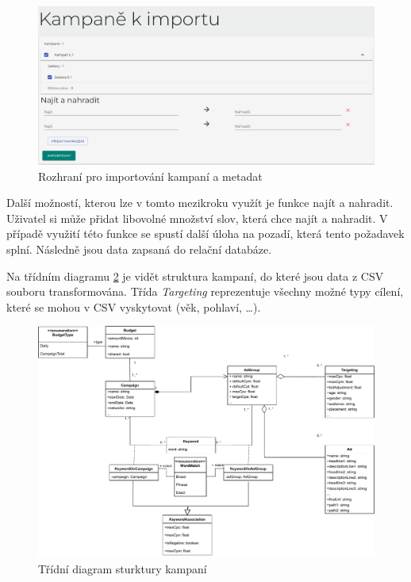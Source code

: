 \begin{figure}[h]
    \centering
    \includegraphics[width=1\textwidth]{Figures/ui/import-sar.png}
    \caption{Rozhraní pro importování kampaní a metadat}
    \label{fig:import-sar}
\end{figure}

Další možností, kterou lze v tomto mezikroku využít je funkce najít a nahradit. Uživatel si může přidat libovolné množství
slov, která chce najít a nahradit. V případě využití této funkce se spustí další úloha na pozadí, která tento požadavek splní.
Následně jsou data zapsaná do relační databáze.

Na třídním diagramu \ref{fig:campaigns-class-diagram} je vidět struktura kampaní, do které jsou data z CSV souboru transformována. Třída \emph{Targeting} reprezentuje všechny
možné typy cílení, které se mohou v CSV vyskytovat (věk, pohlaví, \ldots). 

\begin{figure}[h]
    \centering
    \includegraphics[width=1\textwidth]{Figures/campaigns-class-diagram.pdf}
    \caption{Třídní diagram sturktury kampaní}
    \label{fig:campaigns-class-diagram}
\end{figure}


